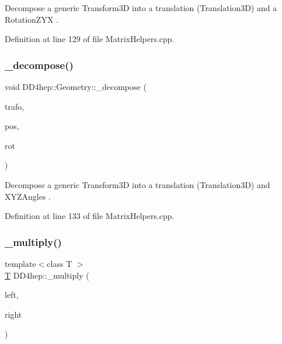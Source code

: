 Decompose a generic Transform3D into a translation (Translation3D) and a Rotation\+Z\+YX . 



Definition at line 129 of file Matrix\+Helpers.\+cpp.

\hypertarget{group___d_d4_h_e_p___g_e_o_m_e_t_r_y_gafde0308d492794fe4b55f66247921482}{}\label{group___d_d4_h_e_p___g_e_o_m_e_t_r_y_gafde0308d492794fe4b55f66247921482} 
\subsubsection{\texorpdfstring{\+\_\+decompose()}{\_decompose()}\hspace{0.1cm}{\footnotesize\ttfamily [4/4]}}
{\footnotesize\ttfamily void D\+D4hep\+::\+Geometry\+::\+\_\+decompose (\begin{DoxyParamCaption}\item[{const \hyperlink{namespace_d_d4hep_1_1_geometry_aeb4c0356d12fd7be49a0aae50514e64b}{Geometry\+::\+Transform3D} \&}]{trafo,  }\item[{\hyperlink{namespace_d_d4hep_1_1_geometry_ab90afde486c9b46f4fa91bc659271b99}{Geometry\+::\+Translation3D} \&}]{pos,  }\item[{\hyperlink{namespace_d_d4hep_1_1_geometry_ab195c63789d4928d291d3b5522151aaa}{X\+Y\+Z\+Angles} \&}]{rot }\end{DoxyParamCaption})}



Decompose a generic Transform3D into a translation (Translation3D) and X\+Y\+Z\+Angles . 



Definition at line 133 of file Matrix\+Helpers.\+cpp.

\hypertarget{group___d_d4_h_e_p___g_e_o_m_e_t_r_y_gab860c2299e2eb50e537c5079fb0c9c51}{}\label{group___d_d4_h_e_p___g_e_o_m_e_t_r_y_gab860c2299e2eb50e537c5079fb0c9c51} 
\subsubsection{\texorpdfstring{\+\_\+multiply()}{\_multiply()}\hspace{0.1cm}{\footnotesize\ttfamily [1/3]}}
{\footnotesize\ttfamily template$<$class T $>$ \\
\hyperlink{class_t}{T} D\+D4hep\+::\+\_\+multiply (\begin{DoxyParamCaption}\item[{const std\+::string \&}]{left,  }\item[{\hyperlink{class_t}{T}}]{right }\end{DoxyParamCaption})}



